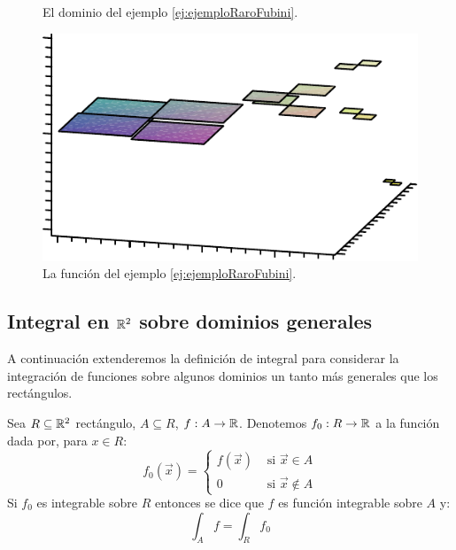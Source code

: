 \begin{figure}[H]
\begin{minipage}[t]{.45\textwidth}
	\centering
	
	\caption{El dominio del ejemplo \ref{ej:ejemploRaroFubini}.}
\label{fig:GraficoFubini1}
\end{minipage}
\hfill
\begin{minipage}[t]{.45\textwidth}
	\centering
	\includegraphics[width=\ScaleIfNeeded]{figuras/funcionejemplorarofubini.pdf}
	\caption{La funci\'on del ejemplo \ref{ej:ejemploRaroFubini}.}
\label{fig:GraficoFubini2}
\end{minipage}
\end{figure}


\subsection{Integral en \texorpdfstring{$\mathbb{R}^2$}{R2} sobre dominios generales }

A continuaci\'on extenderemos la definici\'on de integral para considerar la integraci\'on de funciones sobre algunos dominios un tanto m\'as generales que los rect\'angulos.
\begin{definicion} \label{def:IntegralSobreDominioGeneralR2}
Sea $ R \subseteq \mathbb{R}^2 $ rect\'angulo, $ A \subseteq R $, $f:A \to \mathbb{R} $. Denotemos $ f_0: R \to \mathbb{R} $ a la funci\'on dada por, para $x \in R $:
\[
    f_0(\vec{x}) = \begin{cases}
        f(\vec{x}) & \text{ si } \vec{x} \in A \\
        0    & \text{ si } \vec{x} \notin A
    \end{cases}
\]
Si $ f_0 $ es integrable sobre $ R $ entonces se dice que $ f $ es funci\'on integrable   sobre $ A $ y:
    \[ \int_A f = \int_R f_0 \]
\end{definicion}

